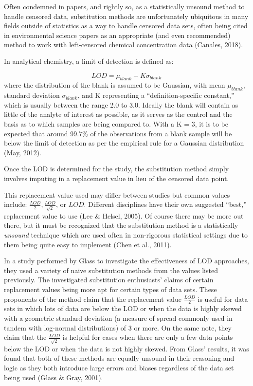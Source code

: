 \documentclass[12pt, twoside]{amherstthesis}
\begin{document}
Often condemned in papers, and rightly so, as a statistically unsound method to handle censored data, substitution methods are unfortunately ubiquitous in many fields outside of statistics as a way to handle censored data sets, often being cited in environmental science papers as an appropriate (and even recommended) method to work with left-censored chemical concentration data (Canales, 2018).

In analytical chemistry, a limit of detection is defined as:

\[LOD = \mu_{blank} + K\sigma_{blank}\]
where the distribution of the blank is assumed to be Gaussian, with mean \(\mu_{blank}\), standard deviation \(\sigma_{blank}\), and K representing a ``definition-specific constant,'' which is usually between the range 2.0 to 3.0. Ideally the blank will contain as little of the analyte of interest as possible, as it serves as the control and the basis as to which samples are being compared to. With a K = 3, it is to be expected that around 99.7\% of the observations from a blank sample will be below the limit of detection as per the empirical rule for a Gaussian distribution (May, 2012).

Once the LOD is determined for the study, the substitution method simply involves imputing in a replacement value in lieu of the censored data point.

This replacement value used may differ between studies but common values include: \(\frac{LOD}{2}, \frac{LOD}{\sqrt2}\), or \(LOD\). Different disciplines have their own suggested ``best,'' replacement value to use (Lee \& Helsel, 2005). Of course there may be more out there, but it must be recognized that the substitution method is a statistically \emph{unsound} technique which are used often in non-rigorous statistical settings due to them being quite easy to implement (Chen et al., 2011).

In a study performed by Glass to investigate the effectiveness of LOD approaches, they used a variety of naive substitution methods from the values listed previously. The investigated substitution enthusiasts' claims of certain replacement values being more apt for certain types of data sets. These proponents of the method claim that the replacement value \(\frac{LOD}{2}\) is useful for data sets in which lots of data are below the LOD or when the data is highly skewed with a geometric standard deviation (a measure of spread commonly used in tandem with log-normal distributions) of 3 or more. On the same note, they claim that the \(\frac{LOD}{\sqrt2}\) is helpful for cases when there are only a few data points below the LOD or when the data is not highly skewed. From Glass' results, it was found that both of these methods are equally unsound in their reasoning and logic as they both introduce large errors and biases regardless of the data set being used (Glass \& Gray, 2001).
\end{document}
